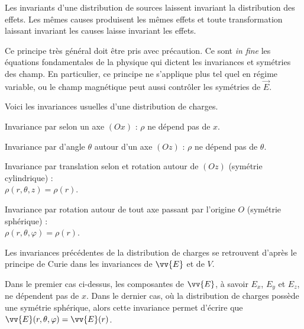 \documentclass[12pt,fancy]{/Users/victor/Documents/COURS/2ACapECL/texmf/tex/latex/Preambles/cours}
\begin{document}
\begin{prop}\label{prop:curie}
Les invariants d’une distribution de sources laissent invariant la distribution des effets. Les mêmes causes produisent les mêmes effets et toute transformation laissant invariant les causes laisse invariant les effets.\end{prop}
\begin{remarque}
  Ce principe très général doit être pris avec précaution. Ce sont \emph{in fine} les équations fondamentales de la physique qui dictent les invariances et symétries des champ. En particulier, ce principe ne s'applique plus tel quel en régime variable, ou le champ magnétique peut aussi contrôler les symétries de $\Vec{E}$.
\end{remarque}
%
Voici les invariances usuelles d'une distribution de charges.
\begin{liste}
\item Invariance par  selon un axe $(Ox)$ : $\rho$ ne dépend pas de $x$.
\item Invariance par  d'angle $\theta$ autour d'un axe $(Oz)$ : $\rho$ ne dépend pas de $\theta$.
\item Invariance par translation selon et rotation autour de $(Oz)$ (symétrie cylindrique) : \\$\rho(r,\theta,z)=\rho(r)$.
\item Invariance par rotation autour de tout axe passant par l’origine $O$  (symétrie sphérique) : \\ $\rho(r,\theta,\varphi)=\rho(r)$.
\end{liste}
Les invariances précédentes de la distribution de charges se retrouvent d'après le principe de Curie dans les invariances de $\vv{E}$ et de $V$.

\begin{remarque}
Dans le premier cas ci-dessus, les composantes de $\vv{E}$, à savoir $E_{x}$, $E_y$ et $E_z$, ne dépendent pas de $x$. Dans le dernier cas, où la distribution de charges possède une symétrie sphérique, alors cette invariance permet d'écrire que $\vv{E}(r,\theta,\varphi)=\vv{E}(r)$.
\end{remarque}
\end{document}
